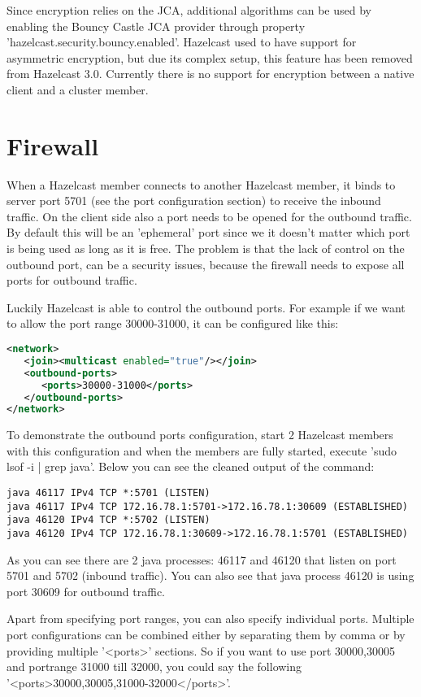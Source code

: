 Since encryption relies on the JCA, additional algorithms can be used by enabling the Bouncy Castle JCA provider through property 'hazelcast.security.bouncy.enabled'. Hazelcast used to have support for asymmetric encryption, but due its complex setup, this feature has been removed from Hazelcast 3.0. Currently there is no support for encryption between a native client and a cluster member.

\section{Firewall}
When a Hazelcast member connects to another Hazelcast member, it binds to server port 5701 (see the port configuration section) to receive the inbound traffic. On the client side also a port needs to be opened for the outbound traffic. By default this will be an 'ephemeral' port since we it doesn't matter which port is being used as long as it is free. The problem is that the lack of control on the outbound port, can be a security issues, because the firewall needs to expose all ports for outbound traffic. 

Luckily Hazelcast is able to control the outbound ports. For example if we want to allow the port range 30000-31000, it can be configured like this:
\begin{lstlisting}[language=xml]
<network>
   <join><multicast enabled="true"/></join>
   <outbound-ports>
      <ports>30000-31000</ports>
   </outbound-ports>
</network>
\end{lstlisting}
To demonstrate the outbound ports configuration, start 2 Hazelcast members with this configuration and when the members are fully started, execute 'sudo lsof -i | grep java'. Below you can see the cleaned output of the command:
\begin{lstlisting}
java 46117 IPv4 TCP *:5701 (LISTEN)
java 46117 IPv4 TCP 172.16.78.1:5701->172.16.78.1:30609 (ESTABLISHED)
java 46120 IPv4 TCP *:5702 (LISTEN)
java 46120 IPv4 TCP 172.16.78.1:30609->172.16.78.1:5701 (ESTABLISHED)
\end{lstlisting}
As you can see there are 2 java processes: 46117 and 46120 that listen on port 5701 and 5702 (inbound traffic). You can also see that java process 46120 is using port 30609 for outbound traffic.

Apart from specifying port ranges, you can also specify individual ports. Multiple port configurations can be combined either by separating them by comma or by providing multiple '<ports>' sections. So if you want to use port 30000,30005 and portrange 31000 till 32000, you could say the following '<ports>30000,30005,31000-32000</ports>'. 


